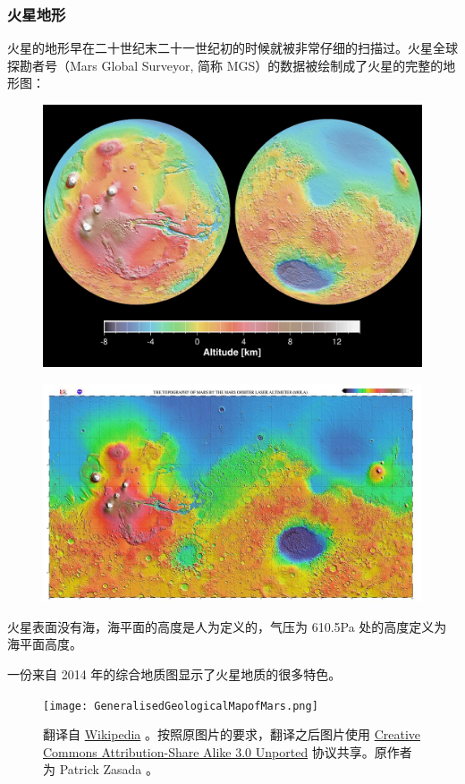 \documentclass[letterpaper,10pt]{sphinxmanual}
\begin{document}
\subsubsection{火星地形}
\label{mars:id8}
火星的地形早在二十世纪末二十一世纪初的时候就被非常仔细的扫描过。火星全球探勘者号（Mars Global Surveyor, 简称 MGS）的数据被绘制成了火星的完整的地形图：
\begin{figure}[htbp]
\centering

\includegraphics{PIA02820.jpg}
\end{figure}
\begin{figure}[htbp]
\centering

\includegraphics{1024px-Mars_topography_MOLA_dataset_HiRes.jpg}
\end{figure}

火星表面没有海，海平面的高度是人为定义的，气压为 610.5Pa 处的高度定义为海平面高度。

一份来自 2014 年的综合地质图显示了火星地质的很多特色。
\begin{figure}[htbp]
\centering
\capstart

\texttt{[image: GeneralisedGeologicalMapofMars.png]}
\caption{翻译自 \href{https://commons.wikimedia.org/wiki/File:Generalised\_Geological\_Map\_of\_Mars.jpg}{Wikipedia} 。按照原图片的要求，翻译之后图片使用 \href{https://creativecommons.org/licenses/by-sa/3.0/deed.en}{Creative Commons Attribution-Share Alike 3.0 Unported} 协议共享。原作者为 Patrick Zasada 。}\end{figure}
\end{document}
